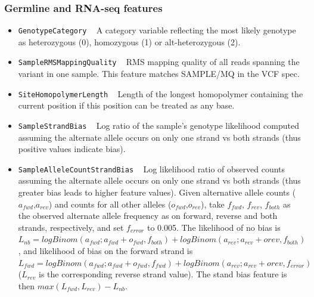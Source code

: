 \documentclass{article}
\begin{document}
\subsubsection{Germline and RNA-seq features}
\begin{itemize}

    \item \texttt{GenotypeCategory} ~ A category variable reflecting the most likely genotype as heterozygous (0), homozygous (1) or alt-heterozygous (2).

    \item \texttt{SampleRMSMappingQuality} ~ RMS mapping quality of all reads spanning the variant in one sample. This feature matches SAMPLE/MQ in the VCF spec.

    \item \texttt{SiteHomopolymerLength} ~ Length of the longest homopolymer containing the current position if this position can be treated as any base.

    \item \texttt{SampleStrandBias} ~ Log ratio of the sample's genotype likelihood computed assuming the alternate allele occurs on only one strand vs both strands (thus positive values indicate bias). %

    \item \texttt{SampleAlleleCountStrandBias} ~ Log likelihood ratio of observed counts assuming the alternate allele occurs on only one strand vs both strands (thus greater bias leads to higher feature values). Given alternative allele counts ($a_{fwd}$,$a_{rev}$) and counts for all other alleles ($o_{fwd}$,$o_{rev}$), take $f_{fwd}$, $f_{rev}$, $f_{both}$ as the observed alternate allele frequency as on forward, reverse and both strands, respectively, and set $f_{error}$ to 0.005. The likelihood of no bias is $L_{nb} = logBinom(a_{fwd}; a_{fwd}+o_{fwd}, f_{both}) + logBinom(a_{rev}; a_{rev}+o{rev}, f_{both})$, and likelihood of bias on the forward strand is $L_{fwd} = logBinom(a_{fwd}; a_{fwd}+o_{fwd}, f_{fwd}) + logBinom(a_{rev}; a_{rev}+o{rev}, f_{error})$ ($L_{rev}$ is the corresponding reverse strand value). The stand bias feature is then $max(L_{fwd},L_{rev}) - L_{nb}$.


\end{itemize}
\end{document}
